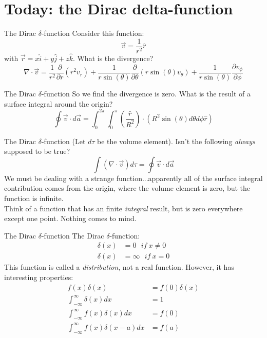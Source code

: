 \documentclass{beamer}
\begin{document}
\section{Today: the Dirac delta-function}

\begin{frame}{The Dirac $\delta$-function}
Consider this function:
\begin{equation}
\vec{v} = \frac{1}{r^2}\hat{r}
\end{equation}
with $\vec{r} = x\hat{i} + y\hat{j} + z\hat{k}$.  What is the divergence?
\begin{equation}
\nabla \cdot \vec{v} = \frac{1}{r^2}\frac{\partial}{\partial r}(r^2 v_r) + \frac{1}{r\sin(\theta)}\frac{\partial}{\partial \theta}(r\sin(\theta) v_\theta) + \frac{1}{r\sin(\theta)} \frac{\partial v_\phi}{\partial \phi}
\end{equation}
\end{frame}

\begin{frame}{The Dirac $\delta$-function}
So we find the divergence is zero.  What is the result of a surface integral around the origin?
\begin{equation}
\oint \vec{v} \cdot d \vec{a} = \int_0^{2\pi} \int_0^{\pi} \left(\frac{\hat{r}}{R^2}\right) \cdot (R^2 \sin(\theta) d\theta d\phi \hat{r})
\end{equation}
\end{frame}

\begin{frame}{The Dirac $\delta$-function}
(Let $d\tau$ be the volume element).  Isn't the following \textit{always} supposed to be true?
\begin{equation}
\int (\nabla \cdot \vec{v}) d\tau = \oint \vec{v} \cdot d \vec{a}
\end{equation}
We must be dealing with a strange function...apparently all of the surface integral contribution comes from the origin, where the volume element is zero, but the function is infinite. \\ \vspace{0.2cm}
Think of a function that has an finite \textit{integral} result, but is zero everywhere except one point.  Nothing comes to mind.
\end{frame}

\begin{frame}{The Dirac $\delta$-function}
The Dirac $\delta$-function:
\begin{align}
\delta(x) &= 0 ~~~ if~x\neq 0 \\
\delta(x) &= \infty ~~~ if~x = 0
\end{align}
This function is called a \textit{distribution}, not a real function.  However, it has interesting properties:
\begin{align}
f(x) \delta(x) &= f(0) \delta(x) \\
\int_{-\infty}^{\infty} \delta(x) dx &= 1 \\
\int_{-\infty}^{\infty} f(x) \delta(x) dx &= f(0) \\
\int_{-\infty}^{\infty} f(x) \delta(x-a) dx &= f(a)
\end{align}
\end{frame}
\end{document}
